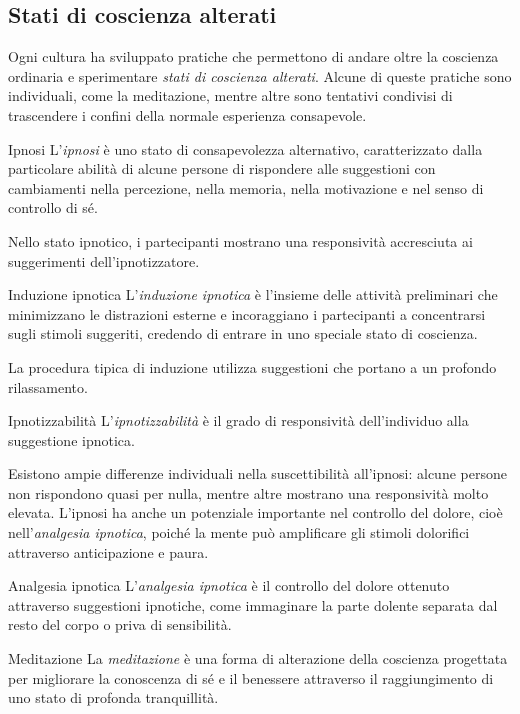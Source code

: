 \documentclass[a4paper]{article}
\begin{document}
\subsection{Stati di coscienza alterati}
Ogni cultura ha sviluppato pratiche che permettono di andare oltre la coscienza ordinaria e sperimentare \emph{stati di coscienza alterati}. Alcune di queste pratiche sono individuali, come la meditazione, mentre altre sono tentativi condivisi di trascendere i confini della normale esperienza consapevole.
\begin{snippetdefinition}{Ipnosi}
    L'\emph{ipnosi} è uno stato di consapevolezza alternativo, caratterizzato dalla particolare abilità di alcune persone di rispondere alle suggestioni con cambiamenti nella percezione, nella memoria, nella motivazione e nel senso di controllo di sé.
\end{snippetdefinition}
Nello stato ipnotico, i partecipanti mostrano una responsività accresciuta ai suggerimenti dell'ipnotizzatore.
\begin{snippetdefinition}{Induzione ipnotica}
    L'\emph{induzione ipnotica} è l'insieme delle attività preliminari che minimizzano le distrazioni esterne e incoraggiano i partecipanti a concentrarsi sugli stimoli suggeriti, credendo di entrare in uno speciale stato di coscienza.
\end{snippetdefinition}
La procedura tipica di induzione utilizza suggestioni che portano a un profondo rilassamento.
\begin{snippetdefinition}{Ipnotizzabilità}
    L'\emph{ipnotizzabilità} è il grado di responsività dell'individuo alla suggestione ipnotica.
\end{snippetdefinition}
Esistono ampie differenze individuali nella suscettibilità all'ipnosi: alcune persone non rispondono quasi per nulla, mentre altre mostrano una responsività molto elevata.
L'ipnosi ha anche un potenziale importante nel controllo del dolore, cioè nell'\emph{analgesia ipnotica}, poiché la mente può amplificare gli stimoli dolorifici attraverso anticipazione e paura.
\begin{snippetdefinition}{Analgesia ipnotica}
    L'\emph{analgesia ipnotica} è il controllo del dolore ottenuto attraverso suggestioni ipnotiche, come immaginare la parte dolente separata dal resto del corpo o priva di sensibilità.
\end{snippetdefinition}
\begin{snippetdefinition}{Meditazione}
    La \emph{meditazione} è una forma di alterazione della coscienza progettata per migliorare la conoscenza di sé e il benessere attraverso il raggiungimento di uno stato di profonda tranquillità.
\end{snippetdefinition}
\end{document}

